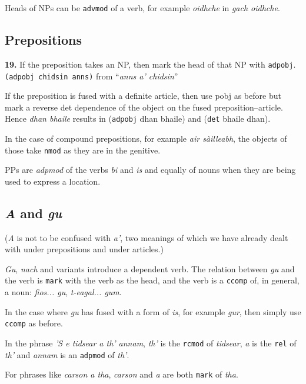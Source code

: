 \documentclass[a4paper]{article}
\begin{document}
 Heads of NPs can be \texttt{advmod} of a verb, for example \textit{oidhche} in \textit{gach oidhche}.

\subsection{Prepositions}

{\bf 19.} If the preposition takes an NP, then mark the head of that NP with \texttt{adpobj}. \texttt{(adpobj chidsin anns)} from ``\textit{anns a' chidsin}''

 If the preposition is fused with a definite article, then use pobj as before but mark a reverse det dependence of the object on the fused preposition--article. Hence \textit{dhan bhaile} results in (\texttt{adpobj} dhan bhaile) and (\texttt{det} bhaile dhan).

 In the case of compound prepositions, for example \textit{air s\`ailleabh}, the objects of those take \texttt{nmod} as they are in the genitive.

 PPs are \textit{adpmod} of the verbs \textit{bi} and \textit{is} and equally of nouns when they are being used to express a location.

\subsection{\textit{A} and \textit{gu}}

(\textit{A} is not to be confused with \textit{a'}, two meanings of which we have already dealt with under prepositions and under articles.)

 \textit{Gu}, \textit{nach} and variants introduce a dependent verb. The relation between \textit{gu} and the verb is \texttt{mark} with the verb as the head, and the verb is a \texttt{ccomp} of, in general, a noun: \textit{fios... gu}, \textit{t-eagal... gum}.

 In the case where \textit{gu} has fused with a form of \textit{is}, for example \textit{gur}, then simply use \texttt{ccomp} as before.

 In the phrase \textit{'S e tidsear a th' annam}, \textit{th'} is the \texttt{rcmod} of \textit{tidsear}, \textit{a} is the \texttt{rel} of \textit{th'} and \textit{annam} is an \texttt{adpmod} of \textit{th'}.

 For phrases like \textit{carson a tha}, \textit{carson} and \textit{a} are both \texttt{mark} of \textit{tha}.
\end{document}

